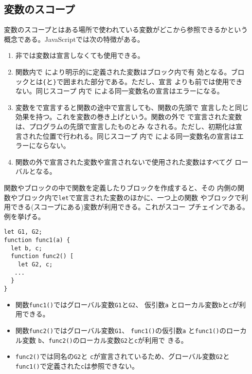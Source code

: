 \subsection{変数のスコープ}
変数のスコープとはある場所で使われている変数がどこから参照できるかという
概念である。JavaScriptでは次の特徴がある。
\begin{enumerate}
 \item 非\Strict では変数は宣言しなくても使用できる。\label{3-4NoDeclare}
 \item \label{3-4DeclareInFunc}
       関数内で  により明示的に定義された変数はブロック内で有
       効となる。ブロックとは\Verb+{+と\Verb+}+で囲まれた部分である。ただし、宣言
       よりも前では使用できない。同じスコープ
       内で  による同一変数名の宣言はエラーになる。
 \item 変数をで宣言すると関数の途中で宣言しても、関数の先頭で
       宣言したと同じ効果を持つ。これを変数の巻き上げという。関数の外で
        で宣言された変数は、プログラムの先頭で宣言したものとみ
       なされる。ただし、初期化は宣言された位置で行われる。同じスコープ
       内で  による同一変数名の宣言はエラーにならない。
 \item 関数の外で宣言された変数や宣言されないで使用された変数はすべてグ
       ローバルとなる。\label{3-4Declare2}
\end{enumerate}
関数やブロックの中で関数を定義したりブロックを作成すると、その
内側の関数やブロック内で\Verb+let+で宣言された変数のほかに、一つ上の関数
やブロックで利用できる(スコープにある)変数が利用できる。これがスコー
プチェインである。
例を挙げる。
\begin{Verbatim}
let G1, G2;
function func1(a) {
  let b, c;
  function func2() [
    let G2, c;
   ...
  }
}
\end{Verbatim}
\begin{itemize}
 \item 関数\Verb+func1()+ではグローバル変数\Verb+G1+と\Verb+G2+、
       仮引数\Verb+a+ とローカル変数\Verb+b+と\Verb+c+が利用できる。
 \item 関数\Verb+func2()+ではグローバル変数\Verb+G1+、
       \Verb+func1()+の仮引数\Verb+a+ と\Verb+func1()+のローカル変数
       \Verb+b+、\Verb+func2()+のローカル変数\Verb+G2+と\Verb+c+が利用で
       きる。
 \item \Verb+func2()+では同名の\texttt{G2}と
       \Verb+c+が宣言されているため、グローバル変数\texttt{G2}と
       \Verb+func1()+で定義された\Verb+c+は参照できない。
\end{itemize}
